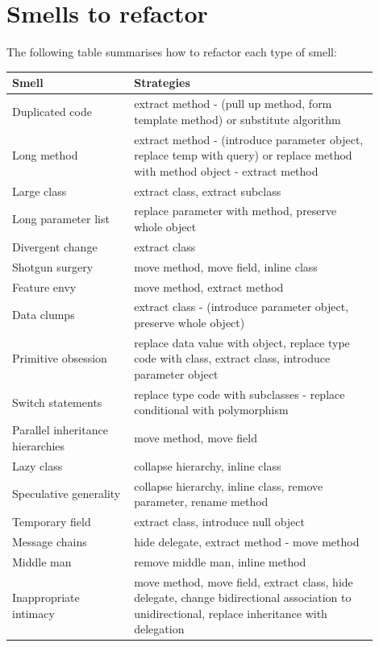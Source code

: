 \documentclass[a4paper, openany]{memoir}
\begin{document}
\section{Smells to refactor}
The following table summarises how to refactor each type of smell:
\begin{longtable}{p{0.3\linewidth} p{0.6\linewidth}}
    \hline
    Smell & Strategies \\
    \hline
    Duplicated code & extract method - (pull up method, form template method) or substitute algorithm \\
    \hline
    Long method & extract method - (introduce parameter object, replace temp with query) or replace method with method object - extract method \\
    \hline
    Large class & extract class, extract subclass \\
    \hline
    Long parameter list & replace parameter with method, preserve whole object \\
    \hline
    Divergent change & extract class \\
    \hline
    Shotgun surgery & move method, move field, inline class \\
    \hline
    Feature envy & move method, extract method \\
    \hline
    Data clumps & extract class - (introduce parameter object, preserve whole object) \\
    \hline
    Primitive obsession & replace data value with object, replace type code with class, extract class, introduce parameter object \\
    \hline
    Switch statements & replace type code with subclasses - replace conditional with polymorphism \\
    \hline
    Parallel inheritance hierarchies & move method, move field \\
    \hline
    Lazy class & collapse hierarchy, inline class \\
    \hline
    Speculative generality & collapse hierarchy, inline class, remove parameter, rename method \\
    \hline
    Temporary field & extract class, introduce null object \\
    \hline
    Message chains & hide delegate, extract method - move method \\
    \hline
    Middle man & remove middle man, inline method \\
    \hline
    Inappropriate intimacy & move method, move field, extract class, hide delegate, change bidirectional association to unidirectional, replace inheritance with delegation \\

\end{longtable}
\end{document}
